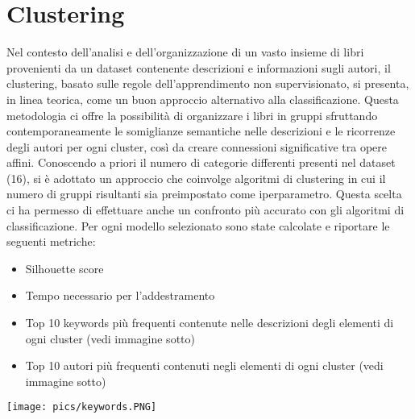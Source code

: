 \documentclass[12pt,oneside]{article}
\begin{document}
\section{Clustering}
    \begin{justify}
        Nel contesto dell'analisi e dell'organizzazione di un vasto insieme di libri provenienti da un dataset contenente descrizioni e informazioni sugli autori, il clustering, basato sulle regole dell'apprendimento non supervisionato, si presenta, in linea teorica, come un buon approccio alternativo alla classificazione. Questa metodologia ci offre la possibilità di organizzare i libri in gruppi sfruttando contemporaneamente le somiglianze semantiche nelle descrizioni e le ricorrenze degli autori per ogni cluster, così da creare connessioni significative tra opere affini. Conoscendo a priori il numero di categorie differenti presenti nel dataset (16), si è adottato un approccio che coinvolge algoritmi di clustering in cui il numero di gruppi risultanti sia preimpostato come iperparametro. Questa scelta ci ha permesso di effettuare anche un confronto più accurato con gli algoritmi di classificazione.
        Per ogni modello selezionato sono state calcolate e riportare le seguenti metriche:
        \begin{itemize}
            \item Silhouette score
            \item Tempo necessario per l’addestramento
            \item Top 10 keywords più frequenti contenute nelle descrizioni degli elementi di ogni cluster (vedi immagine sotto)
            \item Top 10 autori più frequenti contenuti negli elementi di ogni cluster (vedi immagine sotto)
        \end{itemize}

        \texttt{[image: pics/keywords.PNG]}
    \end{justify}
\end{document}
